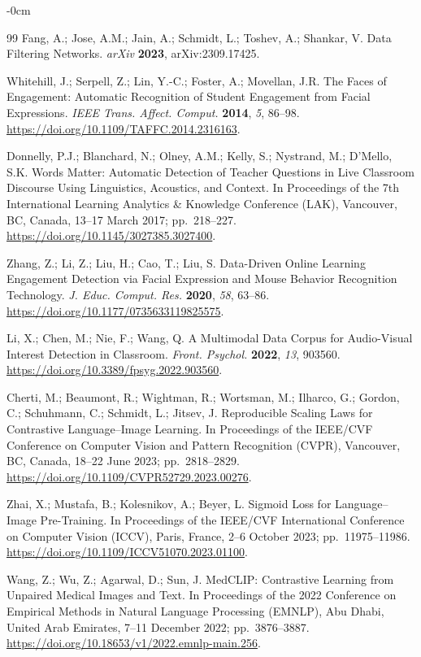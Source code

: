 \documentclass[electronics,article,submit,pdftex,moreauthors]{Definitions/mdpi}
\begin{document}
\begin{adjustwidth}{-\extralength}{0cm}
\begin{thebibliography}{99}
Fang, A.; Jose, A.M.; Jain, A.; Schmidt, L.; Toshev, A.; Shankar, V.
Data Filtering Networks.
\textit{arXiv} \textbf{2023}, arXiv:2309.17425.

Whitehill, J.; Serpell, Z.; Lin, Y.-C.; Foster, A.; Movellan, J.R.
The Faces of Engagement: Automatic Recognition of Student Engagement from Facial Expressions.
\textit{IEEE Trans. Affect. Comput.} \textbf{2014}, \textit{5}, 86--98. \url{https://doi.org/10.1109/TAFFC.2014.2316163}.

Donnelly, P.J.; Blanchard, N.; Olney, A.M.; Kelly, S.; Nystrand, M.; D'Mello, S.K.
Words Matter: Automatic Detection of Teacher Questions in Live Classroom Discourse Using Linguistics, Acoustics, and Context.
In Proceedings of the 7th International Learning Analytics \& Knowledge Conference (LAK), Vancouver, BC, Canada, 13--17 March 2017; pp.~218--227. \url{https://doi.org/10.1145/3027385.3027400}.

Zhang, Z.; Li, Z.; Liu, H.; Cao, T.; Liu, S.
Data-Driven Online Learning Engagement Detection via Facial Expression and Mouse Behavior Recognition Technology.
\textit{J. Educ. Comput. Res.} \textbf{2020}, \textit{58}, 63--86. \url{https://doi.org/10.1177/0735633119825575}.

Li, X.; Chen, M.; Nie, F.; Wang, Q.
A Multimodal Data Corpus for Audio-Visual Interest Detection in Classroom.
\textit{Front. Psychol.} \textbf{2022}, \textit{13}, 903560. \url{https://doi.org/10.3389/fpsyg.2022.903560}.

Cherti, M.; Beaumont, R.; Wightman, R.; Wortsman, M.; Ilharco, G.; Gordon, C.; Schuhmann, C.; Schmidt, L.; Jitsev, J.
Reproducible Scaling Laws for Contrastive Language--Image Learning.
In Proceedings of the IEEE/CVF Conference on Computer Vision and Pattern Recognition (CVPR), Vancouver, BC, Canada, 18--22 June 2023; pp.~2818--2829. \url{https://doi.org/10.1109/CVPR52729.2023.00276}.

Zhai, X.; Mustafa, B.; Kolesnikov, A.; Beyer, L.
Sigmoid Loss for Language--Image Pre-Training.
In Proceedings of the IEEE/CVF International Conference on Computer Vision (ICCV), Paris, France, 2--6 October 2023; pp.~11975--11986. \url{https://doi.org/10.1109/ICCV51070.2023.01100}.

Wang, Z.; Wu, Z.; Agarwal, D.; Sun, J.
MedCLIP: Contrastive Learning from Unpaired Medical Images and Text.
In Proceedings of the 2022 Conference on Empirical Methods in Natural Language Processing (EMNLP), Abu Dhabi, United Arab Emirates, 7--11 December 2022; pp.~3876--3887. \url{https://doi.org/10.18653/v1/2022.emnlp-main.256}.


\end{thebibliography}
\end{adjustwidth}
\end{document}
